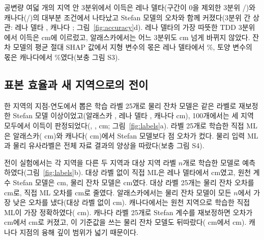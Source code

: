 공변량 여덟 개의 지역 안 3분위에서 이득은 레나 델타(구간이 0을 제외한 3분위 \ngcLesig{}/\ngcLecells{})와 캐나다(\ngcCasig{}/\ngcCacells)의 대부분 조건에서 나타났고 Stefan 모델의 오차와 함께 커졌다(3분위 간 상관: 레나 델타 \ngcLecorr, 캐나다 \ngcCacorr; 그림~\ref{fig:accuracy}d). 레나 델타의 가장 따뜻한 TDD 3분위에서 이득은 \ndtddLewarm{} cm에 이르렀고, 알래스카에서는 어느 3분위도 \ngcAkmaxabs{} cm 넘게 바뀌지 않았다. 잔차 모델의 평균 절대 SHAP 값에서 지형 변수의 몫은 레나 델타에서 \nshapLeResTerrain\%, 토양 변수의 몫은 캐나다에서 \nshapCaResSoil\%였다(보충 그림 S3).

\subsection{표본 효율과 새 지역으로의 전이}
한 지역의 지점-연도에서 뽑은 학습 라벨 25개로 물리 잔차 모델은 같은 라벨로 재보정한 Stefan 모델 이상이었고(알래스카 \nllAkRotwfive, 레나 델타 \nllLeRotwfive, 캐나다 \nllCaRotwfive{} cm), 100개에서는 세 지역 모두에서 이득이 판정되었다(\nllAkRohundred, \nllLeRohundred, \nllCaRohundred{} cm; 그림~\ref{fig:labels}a). 라벨 25개로 학습한 직접 ML은 알래스카(\nllAkDztwfive{} cm)와 캐나다(\nllCaDztwfive{} cm)에서 Stefan 모델보다 점 오차가 컸다. 물리 입력 ML과 물리 유사라벨은 전체 자료 결과의 양상을 따랐다(보충 그림 S4).


전이 실험에서는 각 지역을 다른 두 지역과 대상 지역 라벨 $n$개로 학습한 모델로 예측하였다(그림~\ref{fig:labels}b). 대상 라벨 없이 직접 ML은 레나 델타에서 \ntlrmseLeDszero{} cm였고, 원천 계수 Stefan 모델은 \ntlrmseLePzzero{} cm, 물리 잔차 모델은 \ntlrmseLeRszero{} cm였다. 대상 라벨 25개는 물리 잔차 오차를 \ntlrmseLeRstwfive{} cm로, 직접 ML 오차를 \ntlrmseLeDstwfive{} cm로 줄였다. 알래스카에서는 물리 잔차 모델이 모든 $n$에서 가장 낮은 오차를 냈다(대상 라벨 없이 \ntlrmseAkRszero{} cm). 캐나다에서는 원천 지역으로 학습한 직접 ML이 가장 정확하였다(\ntlrmseCaDszero{} cm). 캐나다 라벨 25개로 Stefan 계수를 재보정하면 오차가 \ntlrmseCaPzzero{} cm에서 \ntlrmseCaPntwfive{} cm로 커졌고, 이 기준값을 쓰는 물리 잔차 모델도 뒤따랐다(\ntlrmseCaRszero{} cm에서 \ntlrmseCaRstwfive{} cm). 캐나다 지점의 융해 깊이 범위가 넓기 때문이다.

